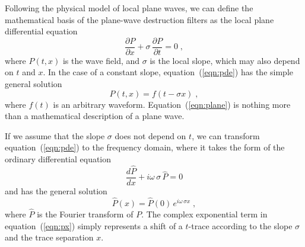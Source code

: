 Following the physical model of local plane waves, we can define the
mathematical basis of the plane-wave destruction filters as the local
plane differential equation
\begin{equation}
  \frac{\partial P}{\partial x} + 
  \sigma\,\frac{\partial P}{\partial t} = 0\;,
  \label{eqn:pde}
\end{equation}
where $P(t,x)$ is the wave field, and $\sigma$ is the local slope, which may
also depend on $t$ and $x$. In the case of a constant slope,
equation~(\ref{eqn:pde}) has the simple general solution
\begin{equation}
  P(t,x) = f(t - \sigma x)\;,
  \label{eqn:plane}
\end{equation}
where $f(t)$ is an arbitrary waveform. Equation~(\ref{eqn:plane}) is
nothing more than a mathematical description of a plane wave.
\par
If we assume that the slope $\sigma$ does not depend on $t$, we can
transform equation~(\ref{eqn:pde}) to the frequency domain, where it
takes the form of the ordinary differential equation
\begin{equation}
  {\frac{d \hat{P}}{d x}} +
  i \omega\,\sigma\, \hat{P} = 0
  \label{eqn:ode}
\end{equation}
and has the general solution
\begin{equation}
  \hat{P} (x) = \hat{P} (0)\,e^{i \omega\,\sigma x}\;,
  \label{eqn:px}
\end{equation}
where $\hat{P}$ is the Fourier transform of $P$. The complex
exponential term in equation~(\ref{eqn:px}) simply represents a shift
of a $t$-trace according to the slope $\sigma$ and the trace separation
$x$. 

